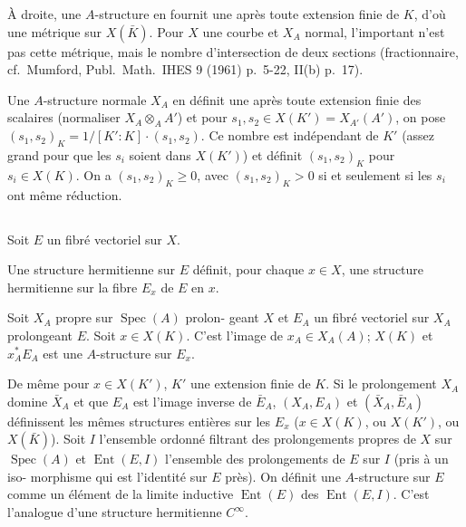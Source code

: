 \documentclass[12pt,a4paper]{article}
\theoremstyle{plain}
\theoremstyle{definition}
\DeclareMathOperator{\Spec}{Spec}
\DeclareMathOperator{\Ent}{Ent}
\begin{document}
\smallskip

\`A droite, une $A$-structure en fournit une apr\`es toute extension finie de
$K$, d'o\`u une m\'etrique sur $X(\bar{K})$. Pour $X$ une courbe et $X_A$ normal, l'important
n'est pas cette m\'etrique, mais le nombre d'intersection de deux sections
(fractionnaire, cf.~Mumford, Publ.\ Math.\ IHES 9 (1961) p.~5-22, II(b) p.~17).

Une $A$-structure normale $X_A$ en d\'efinit une apr\`es toute extension finie des
scalaires (normaliser $X_A \otimes_A A'$) et pour $s_1, s_2 \in X(K') = X_{A'}(A')$, on pose
$(s_1, s_2)_K = 1/[K':K] \cdot (s_1, s_2)$. Ce nombre est ind\'ependant de $K'$ (assez grand
pour que les $s_i$ soient dans $X(K')$) et d\'efinit $(s_1, s_2)_K$ pour $s_i \in X(K)$.
On a $(s_1, s_2)_K \geq 0$, avec $(s_1, s_2)_K > 0$ si et seulement si les $s_i$ ont m\^eme
r\'eduction.

\subsection{}

Soit $E$ un fibr\'e vectoriel sur $X$.

\smallskip

\begin{minipage}[t]{0.48\textwidth}
Une structure hermitienne sur
$E$ d\'efinit, pour chaque $x \in X$,
une structure hermitienne sur
la fibre $E_x$ de $E$ en $x$.
\end{minipage}
\hfill
\begin{minipage}[t]{0.48\textwidth}
Soit $X_A$ propre sur $\Spec(A)$ prolon-
geant $X$ et $E_A$ un fibr\'e vectoriel
sur $X_A$ prolongeant $E$. Soit $x \in
X(K)$. C'est l'image de $x_A \in X_A(A)$;
$X(K)$ et $x_A^* E_A$ est une $A$-structure
sur $E_x$.
\end{minipage}

\smallskip

De m\^eme pour $x \in X(K')$, $K'$ une extension finie de $K$. Si le prolongement
$X_A$ domine $\bar{X}_A$ et que $E_A$ est l'image inverse de $\bar{E}_A$, $(X_A, E_A)$ et $(\bar{X}_A, \bar{E}_A)$
d\'efinissent les m\^emes structures enti\`eres sur les $E_x$ ($x \in X(K)$, ou $X(K')$, ou
$X(\bar{K})$). Soit $I$ l'ensemble ordonn\'e filtrant des prolongements propres de $X$ sur
$\Spec(A)$ et $\Ent(E, I)$ l'ensemble des prolongements de $E$ sur $I$ (pris \`a un iso-
morphisme qui est l'identit\'e sur $E$ pr\`es). On d\'efinit une $A$-structure sur $E$
comme un \'el\'ement de la limite inductive $\Ent(E)$ des $\Ent(E, I)$. C'est l'analogue
d'une structure hermitienne $C^\infty$.
\end{document}
